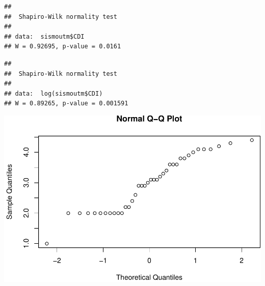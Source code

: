 \documentclass[11pt,]{article}
\newenvironment{Shaded}{\begin{snugshade}}{\end{snugshade}}
\newcommand{\KeywordTok}[1]{\textcolor[rgb]{0.13,0.29,0.53}{\textbf{#1}}}
\newcommand{\OperatorTok}[1]{\textcolor[rgb]{0.81,0.36,0.00}{\textbf{#1}}}
\newcommand{\NormalTok}[1]{#1}
\begin{document}
\begin{Shaded}
\end{Shaded}

\begin{verbatim}
## 
##  Shapiro-Wilk normality test
## 
## data:  sismoutm$CDI
## W = 0.92695, p-value = 0.0161
\end{verbatim}

\begin{Shaded}
\end{Shaded}

\begin{verbatim}
## 
##  Shapiro-Wilk normality test
## 
## data:  log(sismoutm$CDI)
## W = 0.89265, p-value = 0.001591
\end{verbatim}

\begin{Shaded}
\end{Shaded}

\includegraphics{proyecto_files/figure-latex/unnamed-chunk-22-3.pdf}

\begin{Shaded}
\end{Shaded}
\end{document}
